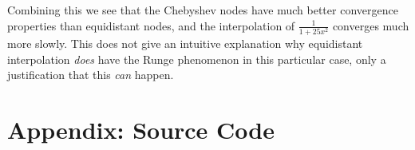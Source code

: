 \documentclass{homework}
\begin{document}
\begin{problem}
Combining this we see that the Chebyshev
nodes have much better convergence properties
than equidistant nodes, and the interpolation of
\(\frac{1}{1+25x^2}\) converges much more slowly.
This does not give an intuitive explanation why
equidistant interpolation \emph{does} have the
Runge phenomenon in this particular case, only
a justification that this \emph{can} happen.
\end{problem}

\newpage
\section*{Appendix: Source Code}
\end{document}
